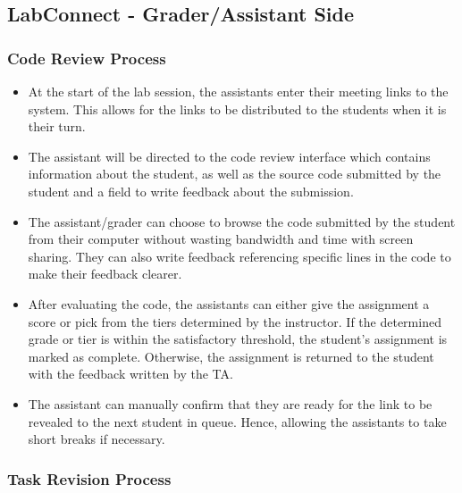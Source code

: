 \documentclass[a4paper, 12pt]{article}
\begin{document}
    \subsection{LabConnect - Grader/Assistant Side}

    \subsubsection{Code Review Process}

    \begin{itemize}
        \item At the start of the lab session, the assistants enter their meeting links to the system.
        This allows for the links to be distributed to the students when it is their turn.
        \item The assistant will be directed to the code review interface which contains information about the student, 
        as well as the source code submitted by the student and a field to write feedback about the submission.
        \item The assistant/grader can choose to browse the code submitted by the student from their computer without wasting bandwidth
        and time with screen sharing. They can also write feedback referencing specific lines in the code to make their
        feedback clearer.
        \item After evaluating the code, the assistants can either give the assignment a score or pick
          from the tiers determined by the instructor. If the determined grade or tier is within the satisfactory
          threshold, the student's assignment is marked as complete. Otherwise, the assignment is returned to the
          student with the feedback written by the TA.
        \item The assistant can manually confirm that they are ready for the link to be revealed to the next student in queue. 
        Hence, allowing the assistants to take short breaks if necessary.
    \end{itemize}

    \subsubsection{Task Revision Process}
\end{document}
